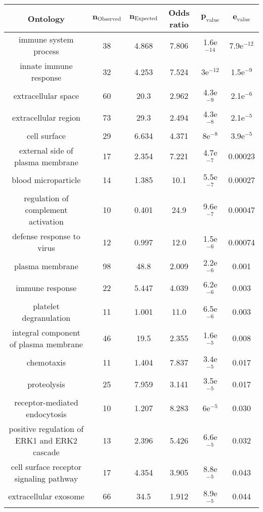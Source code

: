 \documentclass{article}
\begin{document}
\begin{table*}[h!]
	\centering
	\begin{adjustbox}{width = 1\textwidth}
		\small
		\begin{tabular}{|c|c|c|c|c|c|}
			\hline
			\textbf{Ontology} & $\bm{n_{\mathrm{Observed}}}$ & $\bm{n_{\mathrm{Expected}}}$ & \textbf{Odds ratio} & $\bm{p_{\mathrm{value}}}$ & $\bm{e_{\mathrm{value}}}$		\\
			\hline
			immune system process & 38 & 4.868 & 7.806 & 1.6e$^{-14}$ & 7.9e$^{-12}$ \\
			innate immune response & 32 & 4.253 & 7.524 & 3e$^{-12}$ & 1.5e$^{-9}$ \\
			extracellular space & 60 & 20.3 & 2.962 & 4.3e$^{-9}$ & 2.1e$^{-6}$ \\
			extracellular region & 73 & 29.3 & 2.494 & 4.3e$^{-8}$ & 2.1e$^{-5}$ \\
			cell surface & 29 & 6.634 & 4.371 & 8e$^{-8}$ & 3.9e$^{-5}$ \\
			external side of plasma membrane & 17 & 2.354 & 7.221 & 4.7e$^{-7}$ & 0.00023 \\
			blood microparticle & 14 & 1.385 & 10.1 & 5.5e$^{-7}$ & 0.00027 \\
			regulation of complement activation & 10 & 0.401 & 24.9 & 9.6e$^{-7}$ & 0.00047 \\
			defense response to virus & 12 & 0.997 & 12.0 & 1.5e$^{-6}$ & 0.00074 \\
			plasma membrane & 98 & 48.8 & 2.009 & 2.2e$^{-6}$ & 0.001 \\
			immune response & 22 & 5.447 & 4.039 & 6.2e$^{-6}$ & 0.003 \\
			platelet degranulation & 11 & 1.001 & 11.0 & 6.5e$^{-6}$ & 0.003 \\
			integral component of plasma membrane & 46 & 19.5 & 2.355 & 1.6e$^{-5}$ & 0.008 \\
			chemotaxis & 11 & 1.404 & 7.837 & 3.4e$^{-5}$ & 0.017 \\
			proteolysis & 25 & 7.959 & 3.141 & 3.5e$^{-5}$ & 0.017 \\
			receptor-mediated endocytosis & 10 & 1.207 & 8.283 & 6e$^{-5}$ & 0.030 \\
			positive regulation of ERK1 and ERK2 cascade & 13 & 2.396 & 5.426 & 6.6e$^{-5}$ & 0.032 \\
			cell surface receptor signaling pathway & 17 & 4.354 & 3.905 & 8.8e$^{-5}$ & 0.043 \\
			extracellular exosome & 66 & 34.5 & 1.912 & 8.9e$^{-5}$ & 0.044 \\

\end{tabular}
\end{adjustbox}
\end{table*}
\end{document}
